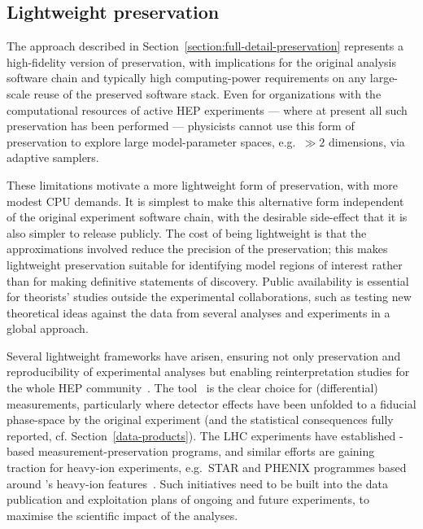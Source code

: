 \documentclass[11pt]{article}
\begin{document}
\subsection{Lightweight preservation}
\label{lightweight}

The approach described in Section~\ref{section:full-detail-preservation} represents a high-fidelity version of preservation, with implications for the original analysis software chain and typically high computing-power requirements on any large-scale reuse of the preserved software stack. Even for organizations with the computational resources of active HEP experiments --- where at present all such preservation has been performed --- physicists cannot use this form of preservation to explore large model-parameter spaces, e.g.~$\gg 2$ dimensions, via adaptive samplers.

These limitations motivate a more lightweight form of preservation, with more modest CPU demands. It is simplest to make this alternative form independent of the original experiment software chain, with the desirable side-effect that it is also simpler to release publicly. The cost of being lightweight is that the approximations involved reduce the precision of the preservation; this makes lightweight preservation suitable for identifying model regions of interest rather than for making definitive statements of discovery. Public availability is essential for theorists' studies outside the experimental collaborations, such as testing new theoretical ideas against the data from several analyses and experiments in a global approach.

Several lightweight frameworks have arisen, ensuring not only preservation and reproducibility of experimental analyses but enabling reinterpretation studies for the whole HEP community~\cite{LHCReinterpretationForum:2020xtr}. The \rivet tool~\cite{Bierlich:2019rhm} is the clear choice for (differential) measurements, particularly where detector effects have been unfolded to a fiducial phase-space by the original experiment (and the statistical consequences fully reported, cf. Section~\ref{data-products}). The LHC experiments have established \rivet-based measurement-preservation programs, and similar efforts are gaining traction for heavy-ion experiments, e.g.~STAR and PHENIX programmes based around \rivet's heavy-ion features~\cite{Bierlich:2020wms}. Such initiatives need to be built into the data publication and exploitation plans of ongoing and future experiments, to maximise the scientific impact of the analyses.
\end{document}
